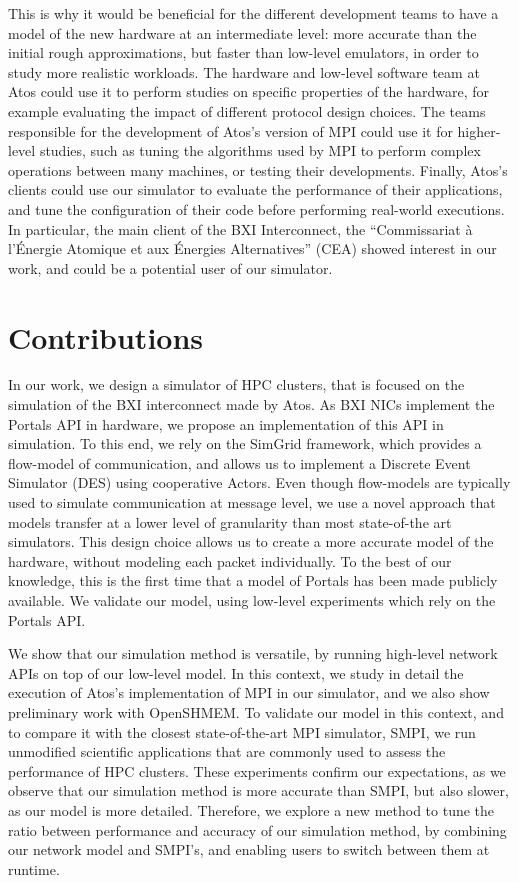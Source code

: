 This is why it would be beneficial for the different development teams to have a
model of the new hardware at an intermediate level: more accurate than the
initial rough approximations, but faster than low-level emulators, in order to
study more realistic workloads. The hardware and low-level software team at Atos
could use it to perform studies on specific properties of the hardware, for
example evaluating the impact of different protocol design choices. The teams
responsible for the development of Atos's version of MPI could use it for
higher-level studies, such as tuning the algorithms used by MPI to perform
complex operations between many machines, or testing their developments.
Finally, Atos's clients could use our simulator to evaluate the performance of
their applications, and tune the configuration of their code before performing
real-world executions. In particular, the main client of the BXI Interconnect,
the ``Commissariat à l'Énergie Atomique et aux Énergies Alternatives'' (CEA)
showed interest in our work, and could be a potential user of our simulator.

\section{Contributions}

In our work, we design a simulator of HPC clusters, that is focused on the
simulation of the BXI interconnect made by Atos. As BXI NICs implement the
Portals API in hardware, we propose an implementation of this API in simulation.
To this end, we rely on the SimGrid framework, which provides a flow-model of
communication, and allows us to implement a Discrete Event Simulator (DES) using
cooperative Actors. Even though flow-models are typically used to simulate
communication at message level, we use a novel approach that models transfer at
a lower level of granularity than most state-of-the art simulators. This design
choice allows us to create a more accurate model of the hardware, without
modeling each packet individually. To the best of our knowledge, this is the
first time that a model of Portals has been made publicly available. We validate
our model, using low-level experiments which rely on the Portals API.

We show that our simulation method is versatile, by running high-level network
APIs on top of our low-level model. In this context, we study in detail the
execution of Atos's implementation of MPI in our simulator, and we also show
preliminary work with OpenSHMEM. To validate our model in this context, and to
compare it with the closest state-of-the-art MPI simulator, SMPI, we run
unmodified scientific applications that are commonly used to assess the
performance of HPC clusters. These experiments confirm our expectations, as we
observe that our simulation method is more accurate than SMPI, but also slower,
as our model is more detailed. Therefore, we explore a new method to tune the
ratio between performance and accuracy of our simulation method, by combining
our network model and SMPI's, and enabling users to switch between them at
runtime.

